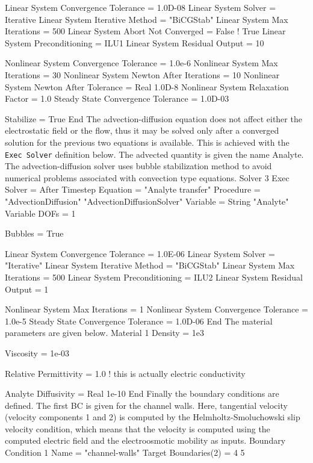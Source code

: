   Linear System Convergence Tolerance = 1.0D-08
  Linear System Solver = Iterative
  Linear System Iterative Method = "BiCGStab"
  Linear System Max Iterations = 500
  Linear System Abort Not Converged = False  ! True
  Linear System Preconditioning = ILU1 
  Linear System Residual Output = 10  

  Nonlinear System Convergence Tolerance = 1.0e-6
  Nonlinear System Max Iterations = 30
  Nonlinear System Newton After Iterations = 10
  Nonlinear System Newton After Tolerance =  Real 1.0D-8
  Nonlinear System Relaxation Factor = 1.0
  Steady State Convergence Tolerance =  1.0D-03

  Stabilize = True
End
\ttend
%
The advection-diffusion equation does not affect either the
electrostatic field or the flow, thus it may be solved only after a
converged solution for the previous two equations is available. This
is achieved with the \texttt{Exec Solver} definition below. The
advected quantity is given the name Analyte.
The advection-diffusion solver uses bubble stabilization method to
avoid numerical problems associated with convection type equations.
%
\ttbegin
Solver 3
  Exec Solver = After Timestep
  Equation = "Analyte transfer"
  Procedure = "AdvectionDiffusion" "AdvectionDiffusionSolver"
  Variable = String "Analyte"
  Variable DOFs = 1

  Bubbles = True

  Linear System Convergence Tolerance = 1.0E-06
  Linear System Solver = "Iterative"
  Linear System Iterative Method = "BiCGStab"
  Linear System Max Iterations = 500
  Linear System Preconditioning = ILU2
  Linear System Residual Output = 1

  Nonlinear System Max Iterations = 1
  Nonlinear System Convergence Tolerance = 1.0e-5
  Steady State Convergence Tolerance =  1.0D-06
End
\ttend
%
The material parameters are given below.
%
\ttbegin
Material 1
  Density = 1e3  
  
  Viscosity = 1e-03

  Relative Permittivity = 1.0    !  this is actually electric conductivity

  Analyte Diffusivity = Real 1e-10 
End
\ttend
%
Finally the boundary conditions are defined. The first BC is given for
the channel walls. Here, tangential velocity (velocity components 1
and 2) is computed by the Helmholtz-Smoluchowski slip velocity
condition, which means that the velocity is computed using the
computed electric field and the electroosmotic mobility as inputs. 
%
\ttbegin
Boundary Condition 1
  Name = "channel-walls"
  Target Boundaries(2) = 4 5

